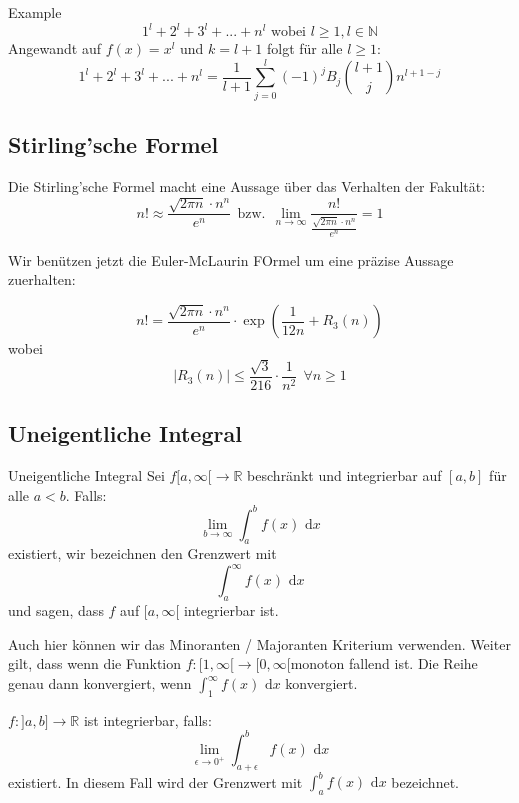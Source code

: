 \documentclass[a4paper,8pt]{extarticle}
\def\limn{\lim_{n\to \infty}}
\def\R{\mathbb{R}}
\def\N{\mathbb{N}}
\def\dx{\text{ d}x}
\begin{document}
\begin{subbox}{Example}
  $$1^l + 2^l + 3^l + ... + n^l \text{ wobei } l \geq 1, l \in \N$$
  Angewandt auf $f(x) = x^l$ und $k = l + 1$ folgt für alle $l \geq 1$:
  $$1^l + 2^l + 3^l + ... + n^l = \frac{1}{l + 1} \sum_{j = 0}^l (-1)^j B_j {l + 1 \choose j} n^{l+1-j}$$
\end{subbox}
\subsection{Stirling'sche Formel}
Die Stirling'sche Formel macht eine Aussage über das Verhalten der Fakultät:
$$n! \approx \frac{\sqrt{2 \pi n}\cdot n^n}{e^n} \ \ \text{bzw.} \ \ \limn \frac{n!}{\frac{\sqrt{2 \pi n}\cdot n^n}{e^n}} = 1$$

Wir benützen jetzt die Euler-McLaurin FOrmel um eine präzise Aussage zuerhalten:
\begin{subbox}{}
  $$n! = \frac{\sqrt{2 \pi n}\cdot n^n}{e^n} \cdot \exp\left(\frac{1}{12n} + R_3(n)\right)$$ wobei $$|R_3(n)| \leq \frac{\sqrt{3}}{216} \cdot \frac{1}{n^2} \ \ \forall n \geq 1$$
\end{subbox}

\subsection{Uneigentliche Integral}
\begin{mainbox}{Uneigentliche Integral}
  Sei $f[a, \infty[ \to \R$ beschränkt und integrierbar auf $[a, b]$ für alle $a < b$. Falls: $$ \lim_{b \to \infty} \int_a^b f(x) \dx$$ existiert, wir bezeichnen den Grenzwert mit $$\int_a^\infty f(x)\dx$$ und sagen, dass $f$ auf $[a, \infty[$ integrierbar ist.
\end{mainbox}
Auch hier können wir das Minoranten / Majoranten Kriterium
verwenden. Weiter gilt, dass wenn die Funktion $f: [1, \infty[\to [0, \infty[$monoton fallend ist. Die Reihe genau dann konvergiert, wenn $\int_1^\infty f(x)\dx$ konvergiert.
\begin{mainbox}{}
  $f:]a, b] \to \R$ ist integrierbar, falls: $$\lim_{\epsilon \to 0^+} \int_{a + \epsilon}^bf(x) \dx$$ existiert. In diesem Fall wird der Grenzwert mit $\int_a^b f(x)\dx$ bezeichnet.
\end{mainbox}
\end{document}
